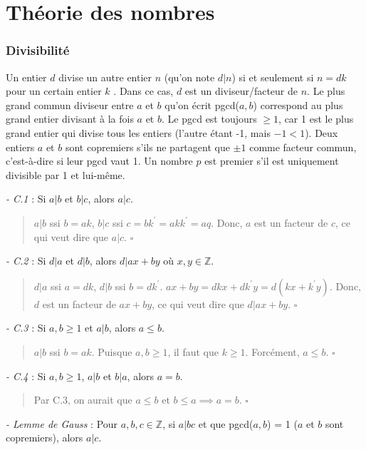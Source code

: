 \section{Théorie des nombres}
\subsubsection*{Divisibilité}
Un entier $d$ divise un autre entier $n$ (qu'on note $d|n$) si et seulement si $n = dk$ pour un certain entier $k$ \cite{hardy75}. Dans ce cas, $d$ est un diviseur/facteur de $n$. Le plus grand commun diviseur entre $a$ et $b$ qu'on écrit pgcd($a,b$) correspond au plus grand entier divisant à la fois $a$ et $b$. Le pgcd est toujours $\geq 1$, car 1 est le plus grand entier qui divise tous les entiers (l'autre étant -1, mais $-1 < 1$). Deux entiers $a$ et $b$ sont copremiers s'ils ne partagent que $\pm 1$ comme facteur commun, c'est-à-dire si leur pgcd vaut 1. Un nombre $p$ est premier s'il est uniquement divisible par 1 et lui-même.

\textit{- C.1} : Si $a|b$ et $b|c$, alors $a|c$.

\begin{quote}
    $a|b$ ssi $b = ak$, $b|c$ ssi $c = bk^{'} = akk^{'} = aq$. Donc, $a$ est un facteur de $c$, ce qui veut dire que $a|c$. $\square$
\end{quote}

\textit{- C.2} : Si $d|a$ et $d|b$, alors $d|ax+by$ où $x,y \in \mathbb{Z}$.

\begin{quote}
    $d|a$ ssi $a = dk$, $d|b$ ssi $b = dk^{'}$. $ax + by = dkx + dk^{'}y = d(kx + k^{'}y)$. Donc, $d$ est un facteur de $ax + by$, ce qui veut dire que $d|ax+by$. $\square$
\end{quote}

\textit{- C.3} : Si $a,b \geq 1$ et $a|b$, alors $a \leq b$.

\begin{quote}
    $a|b$ ssi $b = ak$. Puisque $a,b \geq 1$, il faut que $k \geq 1$. Forcément, $a \leq b$. $\square$
\end{quote}

\textit{- C.4} : Si $a,b \geq 1$, $a|b$ et $b|a$, alors $a = b$.

\begin{quote}
    Par C.3, on aurait que $a \leq b$ et $b \leq a \implies a = b$. $\square$ 
\end{quote}

\textit{- Lemme de Gauss} : Pour $a,b,c \in \mathbb{Z}$, si $a|bc$ et que pgcd($a,b$) = 1 ($a$ et $b$ sont copremiers), alors $a|c$.

